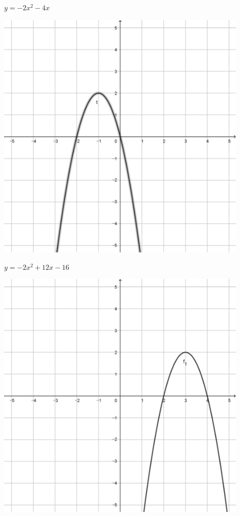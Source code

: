 \documentclass[a4paper]{oblivoir}
\begin{document}
\clearpage
\begin{minipage}{0.45\textwidth}\centering
\(y=-2x^2-4x\)
\par\bigskip\includegraphics[width=0.9\textwidth]{img/2_quadratic_33}
\end{minipage}
\begin{minipage}{0.45\textwidth}\centering
\(y=-2x^2+12x-16\)
\par\bigskip\includegraphics[width=0.9\textwidth]{img/2_quadratic_34}
\end{minipage}\bigskip\bigskip\par
\end{document}
